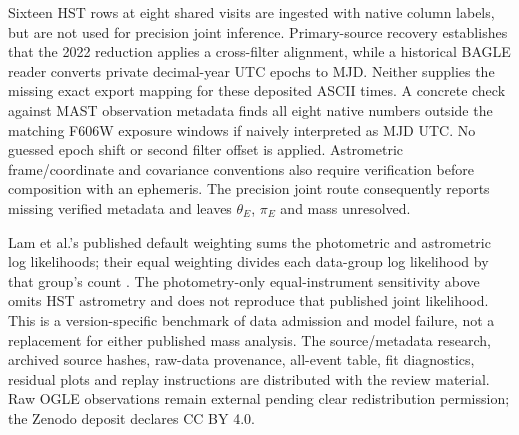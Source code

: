 Sixteen HST rows at eight shared visits are ingested with native column
labels, but are not used for precision joint inference. Primary-source
recovery establishes that the 2022 reduction applies a cross-filter
alignment, while a historical BAGLE reader converts private decimal-year
UTC epochs to MJD. Neither supplies the missing exact export mapping for
these deposited ASCII times. A concrete check against MAST observation
metadata finds all eight native numbers outside the matching F606W
exposure windows if naively interpreted as MJD UTC. No guessed epoch
shift or second filter offset is applied. Astrometric frame/coordinate
and covariance conventions also require verification before composition
with an ephemeris. The precision joint route consequently reports missing
verified metadata and leaves $\theta_E$, $\pi_E$ and mass unresolved.

Lam et al.'s published default weighting sums the photometric and
astrometric log likelihoods; their equal weighting divides each data-group
log likelihood by that group's count \cite{Lam2022Supplement}. The
photometry-only equal-instrument sensitivity above omits HST astrometry
and does not reproduce that published joint likelihood. This is a
version-specific benchmark of data admission and model failure, not a
replacement for either published mass analysis. The source/metadata
research, archived source hashes, raw-data provenance, all-event table,
fit diagnostics, residual plots and replay instructions are distributed
with the review material. Raw OGLE observations remain external pending
clear redistribution permission; the Zenodo deposit declares CC BY 4.0.
